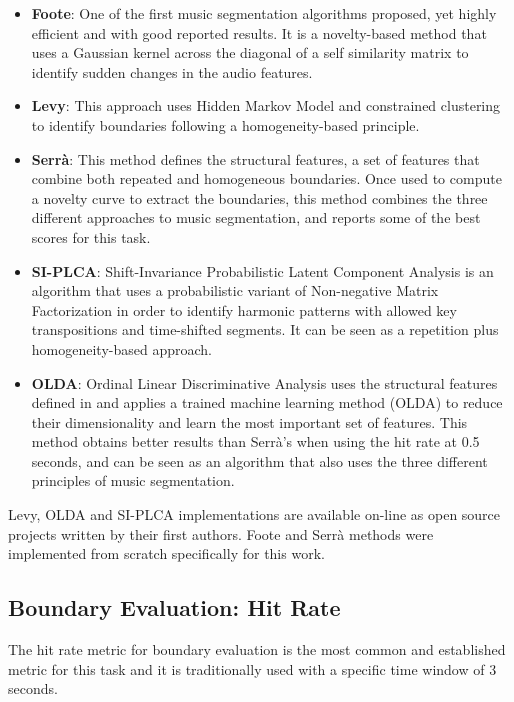 \documentclass{article}
\begin{document}
\begin{itemize}
  \item
    \textbf{Foote}: One of the first music segmentation algorithms proposed, yet highly efficient and with good reported results\cite{Foote1999}. It is a novelty-based method that uses a Gaussian kernel across the diagonal of a self similarity matrix to identify sudden changes in the audio features.
  \item
    \textbf{Levy}: This approach uses Hidden Markov Model and constrained clustering to identify boundaries following a homogeneity-based principle\cite{Levy2008}.
  \item
    \textbf{Serr\`a}: This method defines the structural features, a set of features that combine both repeated and homogeneous boundaries. Once used to compute a novelty curve to extract the boundaries, this method combines the three different approaches to music segmentation, and reports some of the best scores for this task\cite{Serra2013}.
  \item
    \textbf{SI-PLCA}: Shift-Invariance Probabilistic Latent Component Analysis is an algorithm that uses a probabilistic variant of Non-negative Matrix Factorization in order to identify harmonic patterns with allowed key transpositions and time-shifted segments\cite{Weiss2011}. It can be seen as a repetition plus homogeneity-based approach.
  \item 
    \textbf{OLDA}: Ordinal Linear Discriminative Analysis uses the structural features defined in \cite{Serra2013} and applies a trained machine learning method (OLDA) to reduce their dimensionality and learn the most important set of features\cite{McFee2014}. This method obtains better results than Serr\`a's when using the hit rate at 0.5 seconds, and can be seen as an algorithm that also uses the three different principles of music segmentation.
\end{itemize}

Levy, OLDA and SI-PLCA implementations are available on-line as open source projects written by their first authors.
Foote and Serr\`a methods were implemented from scratch specifically for this work.

\subsection{Boundary Evaluation: Hit Rate}\label{subsec:hitrate}

The hit rate metric for boundary evaluation is the most common and established metric for this task and it is traditionally used with a specific time window of 3 seconds\cite{Ong2005}. 
\end{document}

